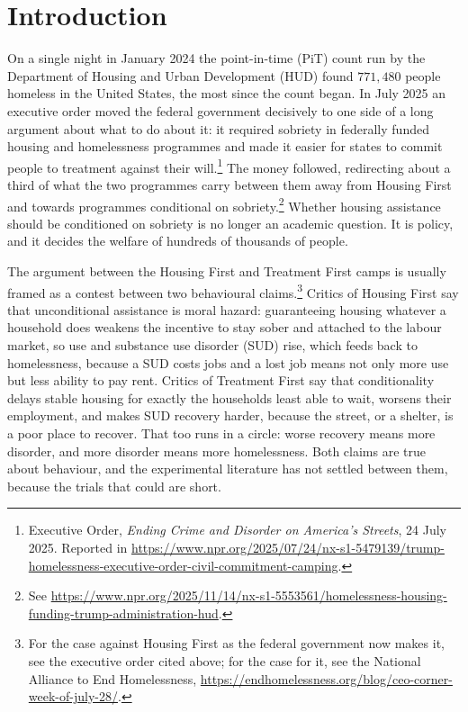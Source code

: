 \documentclass[10pt]{article}
\begin{document}
\vspace{0.8em}


\section{Introduction}\label{sec:intro}


On a single night in January 2024 the point-in-time (PiT) count run by the Department
of Housing and Urban Development (HUD) found $771{,}480$ people homeless in the United
States, the most since the count began. In July 2025 an executive order moved the
federal government decisively to one side of a long argument about what to do about
it: it required sobriety in federally funded housing and homelessness programmes and
made it easier for states to commit people to treatment against their will.\footnote{Executive Order, \emph{Ending Crime and Disorder on America's
Streets}, 24 July 2025. Reported in
\url{https://www.npr.org/2025/07/24/nx-s1-5479139/trump-homelessness-executive-order-civil-commitment-camping}.} The money followed, redirecting about a third of what the two programmes
carry between them away from Housing First and towards programmes conditional on
sobriety.\footnote{See
\url{https://www.npr.org/2025/11/14/nx-s1-5553561/homelessness-housing-funding-trump-administration-hud}.} Whether housing assistance should be conditioned on sobriety is no longer
an academic question. It is policy, and it decides the welfare of hundreds of
thousands of people.



The argument between the Housing First and Treatment First camps is
usually framed as a contest between two behavioural claims.\footnote{For the case
against Housing First as the federal government now makes it, see the executive order
cited above; for the case for it, see the National Alliance to End Homelessness,
\url{https://endhomelessness.org/blog/ceo-corner-week-of-july-28/}.} Critics of
Housing First say that unconditional assistance is moral hazard: guaranteeing housing
whatever a household does weakens the incentive to stay sober and attached to the
labour market, so use and substance use disorder (SUD) rise, which feeds back to
homelessness, because a SUD costs jobs and a lost job means not only more use but
less ability to pay rent. Critics of Treatment First say that conditionality delays
stable housing for exactly the households least able to wait, worsens their
employment, and makes SUD recovery harder, because the street, or a shelter, is a poor place to recover. That too runs in a circle: worse recovery means more disorder, and more
disorder means more homelessness. Both claims are true about behaviour, and the
experimental literature has not settled between them, because the trials that could are short.
\end{document}

